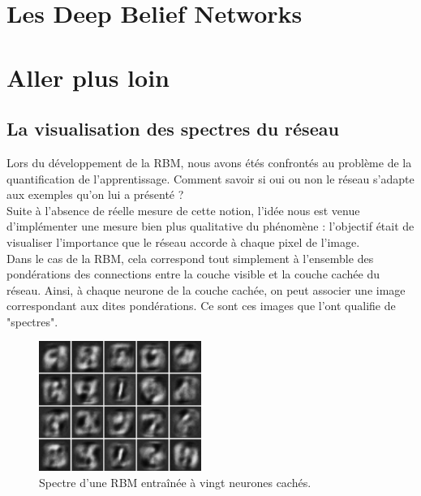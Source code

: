 \documentclass[a4paper,oneside]{report}
\begin{document}
                				

        \chapter{Les Deep Belief Networks}



        \chapter{Aller plus loin}

            \section{La visualisation des spectres du réseau}

                Lors du développement de la RBM, nous avons étés confrontés au problème de la quantification de l'apprentissage. Comment savoir si oui ou non le réseau s'adapte aux exemples qu'on lui a présenté ?\\

                Suite à l'absence de réelle mesure de cette notion, l'idée nous est venue d'implémenter une mesure bien plus qualitative du phénomène : l'objectif était de visualiser l'importance que le réseau accorde à chaque pixel de l'image.\\

                Dans le cas de la RBM, cela correspond tout simplement à l'ensemble des pondérations des connections entre la couche visible et la couche cachée du réseau. Ainsi, à chaque neurone de la couche cachée, on peut associer une image correspondant aux dites pondérations. Ce sont ces images que l'ont qualifie de "spectres".

                \begin{figure}
                    \begin{center}
                        \includegraphics[width=150pt]{Images/filters-01.png}
                    \end{center}
                    \caption{Spectre d'une RBM entraînée à vingt neurones cachés.}
                \end{figure}
\end{document}
